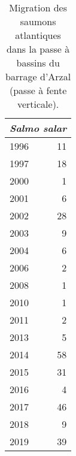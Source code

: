 \begin{table}[ht]
\centering
\begin{tabular}{lr}
  \toprule
   \multicolumn{2}{c}{\textit{Salmo salar}}  \\
 \midrule
1996 & 11 \\ 
  1997 & 18 \\ 
  2000 & 1 \\ 
  2001 & 6 \\ 
  2002 & 28 \\ 
  2003 & 9 \\ 
  2004 & 6 \\ 
  2006 & 2 \\ 
  2008 & 1 \\ 
  2010 & 1 \\ 
  2011 & 2 \\ 
  2013 & 5 \\ 
  2014 & 58 \\ 
  2015 & 31 \\ 
  2016 & 4 \\ 
  2017 & 46 \\ 
  2018 & 9 \\ 
  2019 & 39 \\ 
   \bottomrule
\end{tabular}
\caption{Migration des saumons atlantiques dans la passe à bassins du barrage
				d'Arzal (passe à fente verticale).} 
\label{table_bilanannuel_sat}
\end{table}
